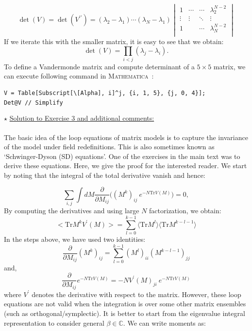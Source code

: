 \documentclass[letter,11pt]{article}
\newcommand{\MA}{\textsc{Mathematica}}
\begin{document}
\begin{equation}
	\det(V) = \det(V^{\prime\prime}) = 
	(\lambda_2 - \lambda_1) \cdots (\lambda_N - \lambda_1)
	\begin{vmatrix}
		1 & \cdots & \cdots & \lambda_2^{N-2} \\ 
		\vdots  & \vdots  & \ddots & \vdots  \\
		1 &  & \cdots &  \lambda_N^{N-2} \\
	\end{vmatrix}
\end{equation}
If we iterate this with the smaller matrix, it is easy to see that we obtain:
\begin{equation}
	\det(V) = \prod_{i<j} (\lambda_j - \lambda_i).
\end{equation}
To define a Vandermonde matrix and compute determinant of a $ 5 \times 5$ matrix, we can execute following command in \MA~:
\begin{mdframed}[backgroundcolor=magenta!2]
	\begin{footnotesize} 
		\verb"V = Table[Subscript[\[Alpha], i]^j, {i, 1, 5}, {j, 0, 4}];"\\ 
		\verb"Det@V // Simplify"
	\end{footnotesize} 
\end{mdframed}

\noindent \noindent $\star$ \ul{Solution to Exercise 3 and additional comments:} 
\\ \\ 
The basic idea of the loop equations of matrix models is to capture the invariance of the model under field redefinitions. This is also sometimes known as `Schwinger-Dyson (SD) equations'. One of the exercises in the main text was to derive these equations. Here, we give the proof for the interested reader. We start by noting that the integral of the total derivative vanish and hence:

\begin{equation}
	\sum_{i,j} \int dM \frac{\partial}{\partial M_{ij}} \Bigg( (M^k)_{ij}~e^{-N\mathrm{Tr} V(M)}\Bigg) = 0, 
\end{equation}
By computing the derivatives and using large $N$ factorization, we obtain:
\begin{equation}
	\Big< \mathrm{Tr} M^{k} V^{\prime}(M) \Big> = \sum_{l=0}^{k-1} \langle \mathrm{Tr} M^{l} \rangle  \langle \mathrm{Tr} M^{k-l-1} \rangle
\end{equation}
In the steps above, we have used two identities:
\begin{equation}
	\frac{\partial}{\partial M_{ij}} (M^{k})_{ij} = \sum_{l=0}^{k-1} (M^{l})_{ii} (M^{k-l-1})_{jj}
\end{equation}
and, 
\begin{equation}
	\frac{\partial}{\partial M_{ij}} e^{-N\mathrm{Tr} V(M)} = -N V^{\prime}(M)_{ji}~e^{-N\mathrm{Tr} V(M)}
\end{equation}
where $V^{\prime}$ denotes the derivative with respect to the matrix. 
However, these loop equations are not valid when the integration is over some other matrix ensembles (such as orthogonal/symplectic). It is better to start from the eigenvalue integral representation to consider general $\beta \in \mathbb{C}$. We can write moments as:
\end{document}
